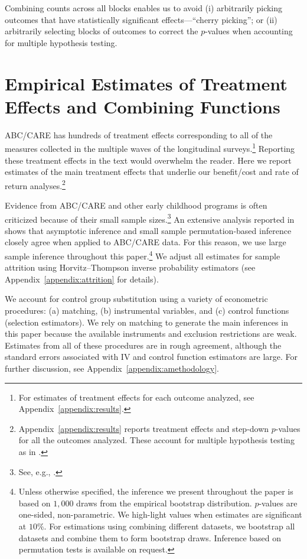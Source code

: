 Combining counts across all blocks enables us to avoid (i) arbitrarily picking outcomes that have statistically significant effects---``cherry picking''; or (ii) arbitrarily selecting blocks of outcomes to correct the $p$-values when accounting for multiple hypothesis testing.

\section{Empirical Estimates of Treatment Effects and Combining Functions}\label{section:c-functions}

ABC/CARE has hundreds of treatment effects corresponding to all of the measures collected in the multiple waves of the longitudinal surveys.\footnote{For estimates of treatment effects for each outcome analyzed, see Appendix~\ref{appendix:results}.} Reporting these treatment effects in the text would overwhelm the reader. Here we report estimates of the main treatment effects that underlie our benefit/cost and rate of return analyses.\footnote{Appendix~\ref{appendix:results} reports treatment effects and step-down $p$-values for all the outcomes analyzed. These account for multiple hypothesis testing as in \citet{Lehman_Romano_2005_AnnStat,Romano_Shaikh_2006_AnnStat}.}

Evidence from ABC/CARE and other early childhood programs is often criticized because of their small sample sizes.\footnote{See, e.g., \cite{Murray_2013_GivingKids_JJHBOOK}.} An extensive analysis reported in \citet{Campbell_Conti_etal_2014_EarlyChildhoodInvestments} shows that asymptotic inference and small sample permutation-based inference closely agree when applied to ABC/CARE data. For this reason, we use large sample inference throughout this paper.\footnote{Unless otherwise specified, the inference we present throughout the paper is based on $1,000$ draws from the empirical bootstrap distribution. $p$-values are one-sided, non-parametric. We high-light values when estimates are significant at $10\%$. For estimations using combining different datasets, we bootstrap all datasets and combine them to form bootstrap draws. Inference based on permutation tests is available on request.} We adjust all estimates for sample attrition using Horvitz--Thompson \citeyearpar{Horvitz_Thompson_1952_JASA} inverse probability estimators (see Appendix~\ref{appendix:attrition} for details).

We account for control group substitution using a variety of econometric procedures: (a) matching, (b) instrumental variables, and (c) control functions (selection estimators). We rely on matching to generate the main inferences in this paper because the available instruments and exclusion restrictions are weak. Estimates from all of these procedures are in rough agreement, although the standard errors associated with IV and control function estimators are large. For further discussion, see Appendix~\ref{appendix:amethodology}.


